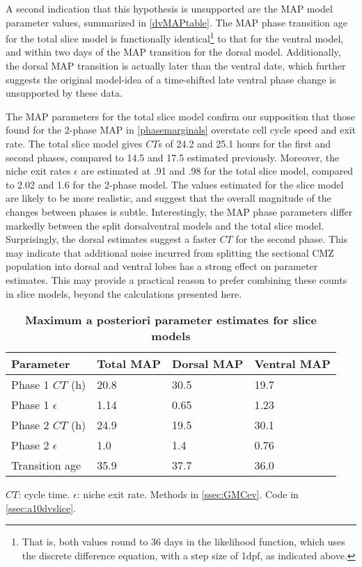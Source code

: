 A second indication that this hypothesis is unsupported are the MAP model parameter values, summarized in \autoref{dvMAPtable}. The MAP phase transition age for the total slice model is functionally identical\footnote{That is, both values round to 36 days in the likelihood function, which uses the discrete difference equation, with a step size of 1dpf, as indicated above.} to that for the ventral model, and within two days of the MAP transition for the dorsal model. Additionally, the dorsal MAP transition is actually later than the ventral date, which further suggests the original model-idea of a time-shifted late ventral phase change is unsupported by these data.

The MAP parameters for the total slice model confirm our supposition that those found for the 2-phase MAP in \autoref{phasemarginals} overstate cell cycle speed and exit rate. The total slice model gives $CT$s of 24.2 and 25.1 hours for the first and second phases, compared to 14.5 and 17.5 estimated previously. Moreover, the niche exit rates $\epsilon$ are estimated at .91 and .98 for the total slice model, compared to 2.02 and 1.6 for the 2-phase model. The values estimated for the slice model are likely to be more realistic, and suggest that the overall magnitude of the changes between phases is subtle. Interestingly, the MAP phase parameters differ markedly between the split dorsal\/ventral models and the total slice model. Surprisingly, the dorsal estimates suggest a faster $CT$ for the second phase. This may indicate that additional noise incurred from splitting the sectional CMZ population into dorsal and ventral lobes has a strong effect on parameter estimates. This may provide a practical reason to prefer combining these counts in slice models, beyond the calculations presented here. 

\begin{table}[!ht]
    \centering
    \caption{{\bf Maximum a posteriori parameter estimates for slice models}}
    \begin{tabular}{|l|l|l|l|}
        \hline
        {\bf Parameter} & {\bf Total MAP} & {\bf Dorsal MAP} & {\bf Ventral MAP}\\ \hline
        Phase 1 $CT$ (h) & 20.8 & 30.5 & 19.7\\ \hline
        Phase 1 $\epsilon$ & 1.14 & 0.65 & 1.23\\ \hline
        Phase 2 $CT$ (h) & 24.9 & 19.5 & 30.1\\ \hline
        Phase 2 $\epsilon$ & 1.0 & 1.4 & 0.76\\ \hline
        Transition age & 35.9 & 37.7 & 36.0\\ \hline
        \end{tabular}
    \begin{flushleft}
        $CT$: cycle time.
        $\epsilon$: niche exit rate.
        Methods in \autoref{ssec:GMCev}.
        Code in \autoref{ssec:a10dvslice}.    
    \end{flushleft}
    \label{dvMAPtable}
\end{table}


